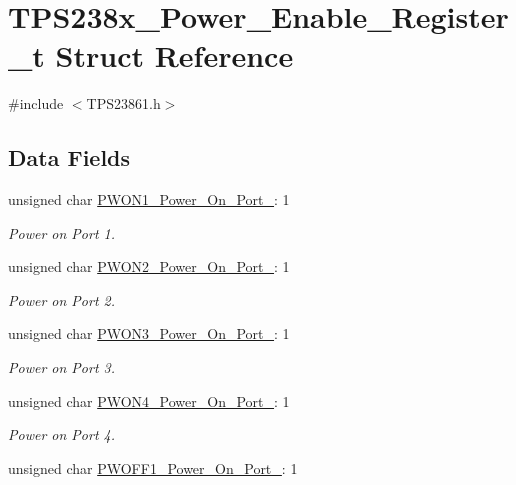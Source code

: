 \hypertarget{struct_t_p_s238x___power___enable___register__t}{\section{T\-P\-S238x\-\_\-\-Power\-\_\-\-Enable\-\_\-\-Register\-\_\-t Struct Reference}
\label{struct_t_p_s238x___power___enable___register__t}
}


{\ttfamily \#include $<$T\-P\-S23861.\-h$>$}

\subsection*{Data Fields}
\begin{DoxyCompactItemize}
\item 
unsigned char \hyperlink{struct_t_p_s238x___power___enable___register__t_ac84bb75b91a724ffa01c41a0d1f9a0be}{P\-W\-O\-N1\-\_\-\-Power\-\_\-\-On\-\_\-\-Port\-\_}\-: 1
\begin{DoxyCompactList}\small\item\em Power on Port 1. \end{DoxyCompactList}\item 
unsigned char \hyperlink{struct_t_p_s238x___power___enable___register__t_a40b9a559c56221c6e564050a5ee14e21}{P\-W\-O\-N2\-\_\-\-Power\-\_\-\-On\-\_\-\-Port\-\_}\-: 1
\begin{DoxyCompactList}\small\item\em Power on Port 2. \end{DoxyCompactList}\item 
unsigned char \hyperlink{struct_t_p_s238x___power___enable___register__t_aac660b220ef28b240923b6e687083024}{P\-W\-O\-N3\-\_\-\-Power\-\_\-\-On\-\_\-\-Port\-\_}\-: 1
\begin{DoxyCompactList}\small\item\em Power on Port 3. \end{DoxyCompactList}\item 
unsigned char \hyperlink{struct_t_p_s238x___power___enable___register__t_a04e97576400bff6014bff06659c3ca7d}{P\-W\-O\-N4\-\_\-\-Power\-\_\-\-On\-\_\-\-Port\-\_}\-: 1
\begin{DoxyCompactList}\small\item\em Power on Port 4. \end{DoxyCompactList}\item 
unsigned char \hyperlink{struct_t_p_s238x___power___enable___register__t_ac7c9c0b1e9473685679f34f94d8d69f9}{P\-W\-O\-F\-F1\-\_\-\-Power\-\_\-\-On\-\_\-\-Port\-\_}\-: 1

\end{DoxyCompactItemize}
